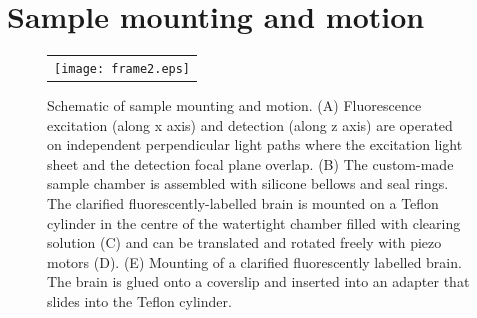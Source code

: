 \documentclass[12pt]{spieman}  %
\begin{document}
\section{Sample mounting and motion}
\label{sec:mounting}
%
		
\begin{figure}
   \begin{center}
   \begin{tabular}{c}
   \texttt{[image: frame2.eps]}
   \end{tabular}
   \end{center}
   \caption{\label{fig:frame2} Schematic of sample mounting and motion. (A) Fluorescence excitation (along x axis) and detection (along z axis) are operated on independent perpendicular light paths where the excitation light sheet and the detection focal plane overlap. (B) The custom-made sample chamber is assembled with silicone bellows and seal rings. The clarified fluorescently-labelled brain is mounted on a Teflon cylinder in the centre of the watertight chamber filled with clearing solution (C) and can be translated and rotated freely with piezo motors (D). (E) Mounting of a clarified fluorescently labelled brain. The brain is glued onto a coverslip and inserted into an adapter that slides into the Teflon cylinder.} 
   \end{figure}		
\end{document}

